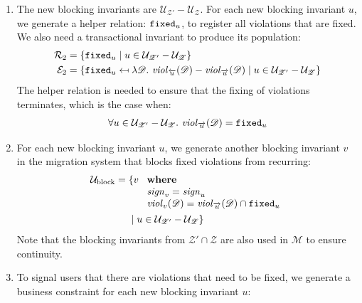 \documentclass[runningheads]{llncs}
\newcommand{\id}[1]{\text{\it #1\/}}
\newcommand{\viol}[2]{\violC{#1}(#2)}
\newcommand{\violC}[1]{\id{viol}_{#1}}
\newcommand{\sign}[1]{\id{sign}_{#1}}
\newcommand{\rels}{\mathcal{R}}   %
\newcommand{\rules}{\mathcal{U}}
\newcommand{\transactions}{\mathcal{E}}
\newcommand{\dataset}{\mathscr{D}}
\newcommand{\schema}{\mathscr{Z}}
\newcommand{\migrsys}{\mathscr{M}}
\begin{document}
\begin{enumerate}
\item The new blocking invariants are $\rules_{\schema'}-\rules_{\schema}$.
   For each new blocking invariant $u$, we generate a helper relation: ${\tt fixed}_u$, to register all violations that are fixed.
   We also need a transactional invariant to produce its population:
   \begin{align}
      \rels_2={}&\{{\tt fixed}_u\mid u \in \rules_{\schema'}-\rules_{\schema}\}\\
      \transactions_2={}&\{{\tt fixed}_u\mapsfrom\lambda\dataset.~\viol{\overleftarrow{u}}{\dataset}-\viol{\overrightarrow{u}}{\dataset}\mid u\in\rules_{\schema'}-\rules_{\schema}\}\label{eqn:enforceForRules}
   \end{align}
   The helper relation is needed to ensure that the fixing of violations terminates,
   which is the case when:
   \begin{align}
      \forall u\in\rules_{\schema'}-\rules_{\schema}.~\viol{\overrightarrow{u}}{\dataset}={\tt fixed}_u\label{eqn:fixingTerminates}
   \end{align}
\item For each new blocking invariant $u$, we generate another blocking invariant $v$ in the migration system that blocks fixed violations from recurring:
   \begin{align}
      \rules_\text{block}={}&\{v\ 
      \begin{array}[t]{l}
         \text{\bf where}\\
         \sign{v}=\sign{u}\\
         \viol{v}{\dataset}=\viol{\overrightarrow{u}}{\dataset}\cap{\tt fixed}_u
      \end{array}\\
      &\mid u\in\rules_{\schema'}-\rules_{\schema}\}\notag
   \end{align}
   Note that the blocking invariants from $\schema'\cap\schema$ are also used in $\migrsys$ to ensure continuity.
\item To signal users that there are violations that need to be fixed, we generate a business constraint for each new blocking invariant $u$:

\end{enumerate}
\end{document}
